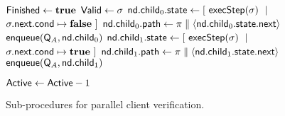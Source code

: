 \begin{figure}[ht]
\begin{minipage}{\textwidth}
\begin{algorithm}[H]
\begin{algorithmic}[1]
      \label{fig:paralg:isIOInstruction}
          \State $\mathsf{Finished} \gets \textbf{true}$
          \State $\mathsf{Valid} \gets \sigma$
          \label{fig:paralg:returnSuccess}
        \EndIf
        \label{fig:paralg:isSymbolicBranch}
        \State $\mathsf{nd}.\mathsf{child}_{0}.\mathsf{state} \gets [~\mathsf{execStep}(\sigma)~\mid$ $\sigma.\mathsf{next}.\mathsf{cond} \mapsto \textbf{false}~]$
        \label{fig:paralg:branchFalse}
        \State $\mathsf{nd}.\mathsf{child}_{0}.\mathsf{path} \gets \pi \parallel \langle \mathsf{nd}.\mathsf{child}_{0}.\mathsf{state}.\mathsf{next} \rangle$
        \label{fig:paralg:pathExtendFalse}
        \label{fig:paralg:checkFalse}
          \State \Atomic $\mathsf{enqueue}(\mathsf{Q}_{A}, \mathsf{nd}.\mathsf{child}_{0})$
          \label{fig:paralg:addFalse}
        \EndIf
        \State $\mathsf{nd}.\mathsf{child}_{1}.\mathsf{state} \gets [~\mathsf{execStep}(\sigma)~\mid$ $\sigma.\mathsf{next}.\mathsf{cond} \mapsto \textbf{true}~]$
        \label{fig:paralg:branchTrue}
        \State $\mathsf{nd}.\mathsf{child}_{1}.\mathsf{path} \gets \pi \parallel \langle \mathsf{nd}.\mathsf{child}_{1}.\mathsf{state}.\mathsf{next} \rangle$
        \label{fig:paralg:pathExtendTrue}
        \label{fig:paralg:checkTrue}
          \State \Atomic $\mathsf{enqueue}(\mathsf{Q}_{A}, \mathsf{nd}.\mathsf{child}_{1})$
          \label{fig:paralg:addTrue}
        \EndIf

      \EndIf
    \EndIf
    \State \Atomic $\mathsf{Active} \gets \mathsf{Active} - 1$
  \EndIf

\EndWhile
\label{fig:paralg:mainWhileEnd}
\EndProcedure

\end{algorithmic}
\end{algorithm}
\end{minipage}
\caption{Sub-procedures for parallel client verification.\label{fig:paralg:sub}}
\end{figure}
\clearpage


